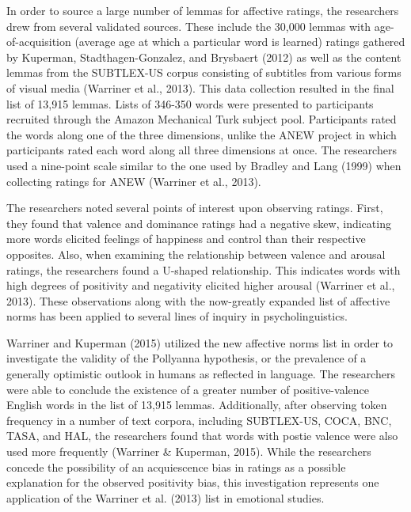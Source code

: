 \documentclass[,man]{apa6}
\begin{document}
In order to source a large number of lemmas for affective ratings, the researchers drew from several validated sources. These include the 30,000 lemmas with age-of-acquisition (average age at which a particular word is learned) ratings gathered by Kuperman, Stadthagen-Gonzalez, and Brysbaert (2012) as well as the content lemmas from the SUBTLEX-US corpus consisting of subtitles from various forms of visual media (Warriner et al., 2013). This data collection resulted in the final list of 13,915 lemmas. Lists of 346-350 words were presented to participants recruited through the Amazon Mechanical Turk subject pool. Participants rated the words along one of the three dimensions, unlike the ANEW project in which participants rated each word along all three dimensions at once. The researchers used a nine-point scale similar to the one used by Bradley and Lang (1999) when collecting ratings for ANEW (Warriner et al., 2013).

The researchers noted several points of interest upon observing ratings. First, they found that valence and dominance ratings had a negative skew, indicating more words elicited feelings of happiness and control than their respective opposites. Also, when examining the relationship between valence and arousal ratings, the researchers found a U-shaped relationship. This indicates words with high degrees of positivity and negativity elicited higher arousal (Warriner et al., 2013). These observations along with the now-greatly expanded list of affective norms has been applied to several lines of inquiry in psycholinguistics.

Warriner and Kuperman (2015) utilized the new affective norms list in order to investigate the validity of the Pollyanna hypothesis, or the prevalence of a generally optimistic outlook in humans as reflected in language. The researchers were able to conclude the existence of a greater number of positive-valence English words in the list of 13,915 lemmas. Additionally, after observing token frequency in a number of text corpora, including SUBTLEX-US, COCA, BNC, TASA, and HAL, the researchers found that words with postie valence were also used more frequently (Warriner \& Kuperman, 2015). While the researchers concede the possibility of an acquiescence bias in ratings as a possible explanation for the observed positivity bias, this investigation represents one application of the Warriner et al. (2013) list in emotional studies.
\end{document}
